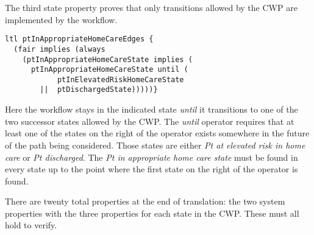 The third state property proves that only transitions allowed by the CWP are implemented by the workflow.
%
{\small
\begin{lstlisting}[style=myPromela]
ltl ptInAppropriateHomeCareEdges {
  (fair implies (always 
    (ptInAppropriateHomeCareState implies (
      ptInAppropriateHomeCareState until (
            ptInElevatedRiskHomeCareState
        ||  ptDischargedState)))))}
\end{lstlisting}
}
%
\noindent Here the workflow stays in the indicated state \emph{until} it transitions to one of the two successor states allowed by the CWP.  The \emph{until} operator requires that at least one of the states on the right of the operator exists somewhere in the future of the path being considered. Those states are either \emph{Pt at elevated risk in home care} or \emph{Pt discharged}. The \emph{Pt in appropriate home care state} must be found in every state up to the point where the first state on the right of the operator is found. 

There are twenty total properties at the end of translation: the two system properties with the three properties for each state in the CWP. These must all hold to verify.
